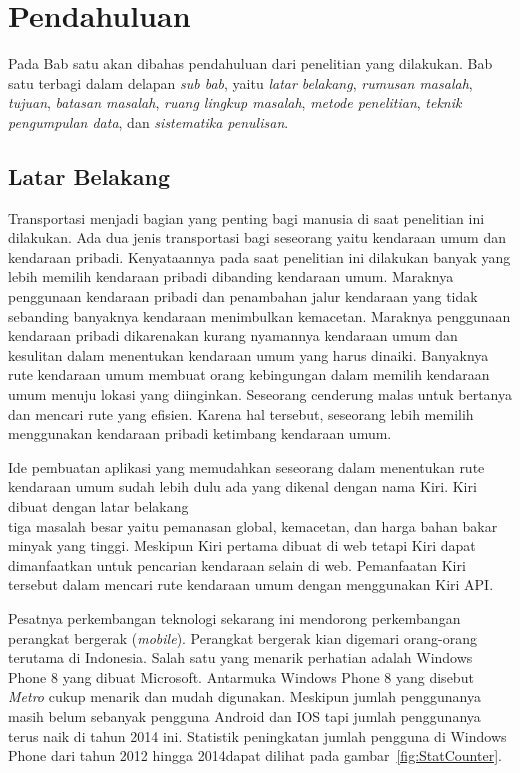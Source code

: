 \chapter{Pendahuluan}
\label{chap:intro}

Pada Bab satu akan dibahas pendahuluan dari penelitian yang dilakukan. Bab satu terbagi dalam delapan \textit{sub bab}, yaitu \textit{latar belakang}, \textit{rumusan masalah}, \textit{tujuan}, \textit{batasan masalah}, \textit{ruang lingkup masalah}, \textit{metode penelitian}, \textit{teknik pengumpulan data}, dan \textit{sistematika penulisan}.

\section{Latar Belakang}
\label{sec:latar_belakang}
\hspace{0.5cm} Transportasi menjadi bagian yang penting bagi manusia di saat penelitian ini dilakukan. Ada dua jenis transportasi bagi seseorang yaitu kendaraan umum dan kendaraan pribadi. Kenyataannya pada saat penelitian ini dilakukan banyak yang lebih memilih kendaraan pribadi dibanding kendaraan umum. Maraknya penggunaan kendaraan pribadi dan penambahan jalur kendaraan yang tidak sebanding banyaknya kendaraan menimbulkan kemacetan. Maraknya penggunaan kendaraan pribadi dikarenakan kurang nyamannya kendaraan umum dan kesulitan dalam menentukan kendaraan umum yang harus dinaiki. Banyaknya rute kendaraan umum membuat orang kebingungan dalam memilih kendaraan umum menuju lokasi yang diinginkan. Seseorang cenderung malas untuk bertanya dan mencari rute yang efisien. Karena hal tersebut, seseorang lebih memilih menggunakan kendaraan pribadi ketimbang kendaraan umum. 

Ide pembuatan aplikasi yang memudahkan seseorang dalam menentukan rute kendaraan umum sudah lebih dulu ada yang dikenal dengan nama Kiri. Kiri dibuat dengan latar belakang \\ tiga masalah besar yaitu pemanasan global, kemacetan, dan harga bahan bakar minyak yang tinggi\footnotemark[1]. Meskipun Kiri pertama dibuat di web tetapi Kiri dapat dimanfaatkan untuk pencarian kendaraan selain di web. Pemanfaatan Kiri tersebut dalam mencari rute kendaraan umum dengan menggunakan Kiri API.

Pesatnya perkembangan teknologi sekarang ini mendorong perkembangan perangkat bergerak (\textit{mobile}). Perangkat bergerak kian digemari orang-orang terutama di Indonesia. Salah satu yang menarik perhatian adalah Windows Phone 8 yang dibuat Microsoft. Antarmuka Windows Phone 8 yang disebut \textit{Metro} cukup menarik dan mudah digunakan. Meskipun jumlah penggunanya masih belum sebanyak pengguna Android dan IOS tapi jumlah penggunanya terus naik di tahun 2014 ini. Statistik peningkatan jumlah pengguna di Windows Phone dari tahun 2012 hingga 2014\footnotemark[2] dapat dilihat pada gambar~\ref{fig:StatCounter}.

